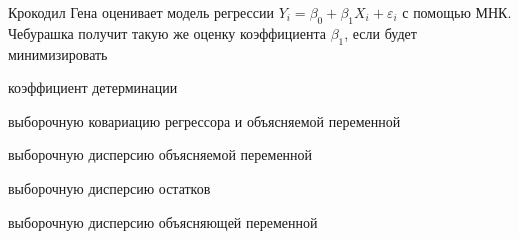 
\begin{question}
Крокодил Гена оценивает модель регрессии
\(Y_i = \beta_0 + \beta_1 X_i + \varepsilon_i\) с помощью МНК. Чебурашка
получит такую же оценку коэффициента \(\beta_1\), если будет
минимизировать
\begin{answerlist}
  \item коэффициент детерминации
  \item выборочную ковариацию регрессора и объясняемой переменной
  \item выборочную дисперсию объясняемой переменной
  \item выборочную дисперсию остатков
  \item выборочную дисперсию объясняющей переменной
\end{answerlist}
\end{question}


